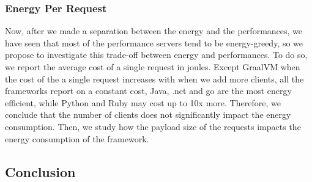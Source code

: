 \subsubsection{Energy Per Request}
Now, after we made a separation between the energy and the performances, we have seen that most of the performance servers tend to be energy-greedy, so we propose to investigate this trade-off between energy and performances.
To do so, we report the average cost of a single request in joules.
Except GraalVM when the cost of the a single request increases with when we add more clients, all the frameworks report on a constant cost, Java, .net and go are the most energy efficient, while Python and Ruby may cost up to 10x more.
Therefore, we conclude that the number of clients does not significantly impact the energy consumption.
Then, we study how the payload size of the requests impacts the energy consumption of the framework.




\subsection{Conclusion }
